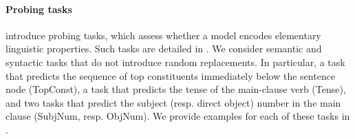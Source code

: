 

\paragraph{Probing tasks} \textcite{conneau_18} introduce probing tasks, which assess whether a model encodes elementary linguistic properties. Such tasks are detailed in . We consider semantic and syntactic tasks that do not introduce random replacements. In particular, a task that predicts the sequence of top constituents immediately below the sentence node (TopConst), a task that predicts the tense of the main-clause verb (Tense), and two tasks that predict the subject (resp. direct object) number in the main clause (SubjNum, resp. ObjNum). We provide examples for each of these tasks in .

